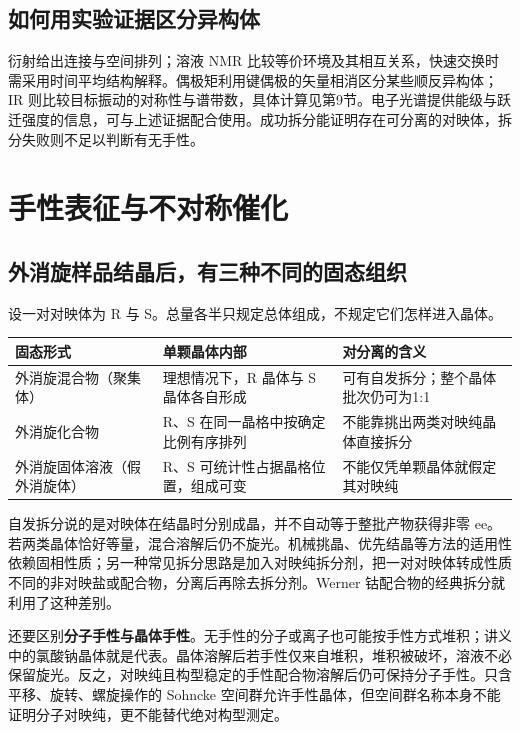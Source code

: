 \subsection{如何用实验证据区分异构体}
衍射给出连接与空间排列；溶液 NMR 比较等价环境及其相互关系，快速交换时需采用时间平均结构解释。偶极矩利用键偶极的矢量相消区分某些顺反异构体；IR 则比较目标振动的对称性与谱带数，具体计算见第9节。电子光谱提供能级与跃迁强度的信息，可与上述证据配合使用。成功拆分能证明存在可分离的对映体，拆分失败则不足以判断有无手性。

\section{手性表征与不对称催化}

\subsection{外消旋样品结晶后，有三种不同的固态组织}
设一对对映体为 R 与 S。总量各半只规定总体组成，不规定它们怎样进入晶体。

\begin{center}
\small
\begin{tabularx}{\linewidth}{@{}l X X@{}}
\toprule
固态形式 & 单颗晶体内部 & 对分离的含义 \\
\midrule
外消旋混合物（聚集体） & 理想情况下，R 晶体与 S 晶体各自形成 & 可有自发拆分；整个晶体批次仍可为1:1 \\
外消旋化合物 & R、S 在同一晶格中按确定比例有序排列 & 不能靠挑出两类对映纯晶体直接拆分 \\
外消旋固体溶液（假外消旋体） & R、S 可统计性占据晶格位置，组成可变 & 不能仅凭单颗晶体就假定其对映纯 \\
\bottomrule
\end{tabularx}
\end{center}

自发拆分说的是对映体在结晶时分别成晶，并不自动等于整批产物获得非零 ee。若两类晶体恰好等量，混合溶解后仍不旋光。机械挑晶、优先结晶等方法的适用性依赖固相性质；另一种常见拆分思路是加入对映纯拆分剂，把一对对映体转成性质不同的非对映盐或配合物，分离后再除去拆分剂。Werner 钴配合物的经典拆分就利用了这种差别。

还要区别\textbf{分子手性与晶体手性}。无手性的分子或离子也可能按手性方式堆积；讲义中的氯酸钠晶体就是代表。晶体溶解后若手性仅来自堆积，堆积被破坏，溶液不必保留旋光。反之，对映纯且构型稳定的手性配合物溶解后仍可保持分子手性。只含平移、旋转、螺旋操作的 Sohncke 空间群允许手性晶体，但空间群名称本身不能证明分子对映纯，更不能替代绝对构型测定。

